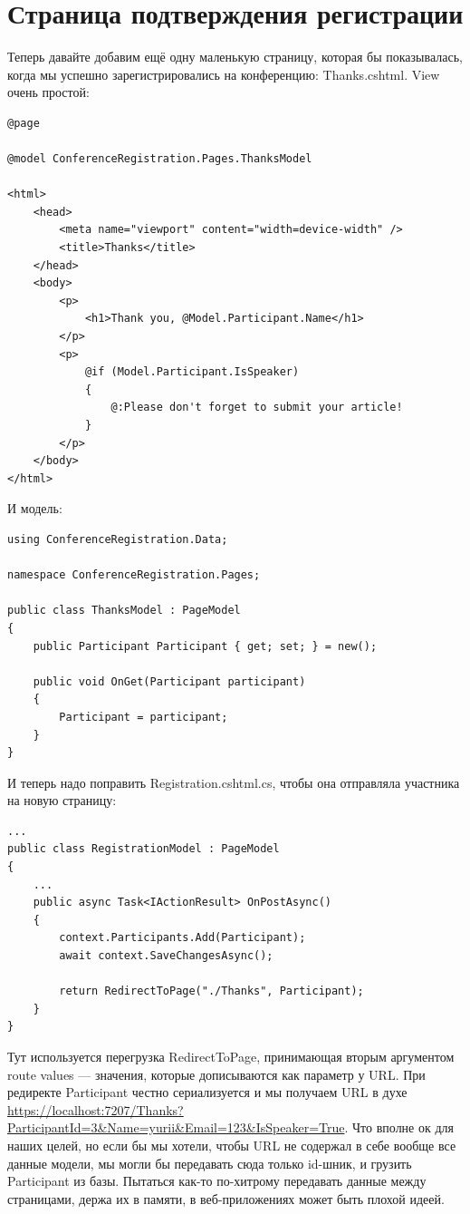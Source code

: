 \documentclass{../../text-style}
\begin{document}
\section{Страница подтверждения регистрации}

Теперь давайте добавим ещё одну маленькую страницу, которая бы показывалась, когда мы успешно зарегистрировались на конференцию: Thanks.cshtml. View очень простой:

\begin{verbatim}
@page

@model ConferenceRegistration.Pages.ThanksModel

<html>
    <head>
        <meta name="viewport" content="width=device-width" />
        <title>Thanks</title>
    </head>
    <body>
        <p>
            <h1>Thank you, @Model.Participant.Name</h1>
        </p>
        <p>
            @if (Model.Participant.IsSpeaker)
            {
                @:Please don't forget to submit your article!
            }
        </p>
    </body>
</html>
\end{verbatim}

И модель: 

\begin{verbatim}
using ConferenceRegistration.Data;

namespace ConferenceRegistration.Pages;

public class ThanksModel : PageModel
{
    public Participant Participant { get; set; } = new();

    public void OnGet(Participant participant)
    {
        Participant = participant;
    }
}
\end{verbatim}

И теперь надо поправить Registration.cshtml.cs, чтобы она отправляла участника на новую страницу:

\begin{verbatim}
...
public class RegistrationModel : PageModel
{
    ...
    public async Task<IActionResult> OnPostAsync()
    {
        context.Participants.Add(Participant);
        await context.SaveChangesAsync();

        return RedirectToPage("./Thanks", Participant);
    }
}
\end{verbatim}

Тут используется перегрузка RedirectToPage, принимающая вторым аргументом route values --- значения, которые дописываются как параметр у URL. При редиректе Participant честно сериализуется и мы получаем URL в духе \url{https://localhost:7207/Thanks?ParticipantId=3&Name=yurii&Email=123&IsSpeaker=True}. Что вполне ок для наших целей, но если бы мы хотели, чтобы URL не содержал в себе вообще все данные модели, мы могли бы передавать сюда только id-шник, и грузить Participant из базы. Пытаться как-то по-хитрому передавать данные между страницами, держа их в памяти, в веб-приложениях может быть плохой идеей.
\end{document}
